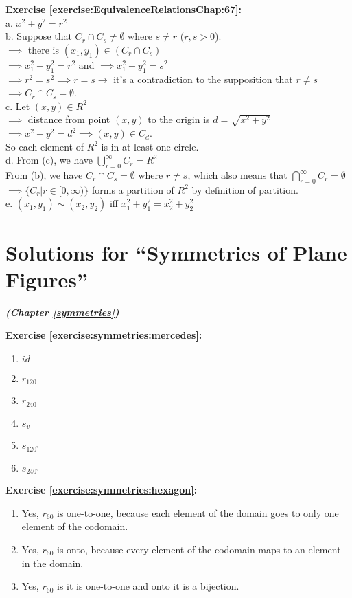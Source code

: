 \textbf{Exercise \ref{exercise:EquivalenceRelationsChap:67}:}\\
a. $x^2+y^2=r^2$\\
b. Suppose that $C_r\cap C_s \neq \emptyset$ where $s\neq r$ ($r,s>0$).\\
$\implies$  there is $(x_1,y_1)\in (C_r\cap C_s)$\\
$\implies x_1^2+y_1^2=r^2$ and $\implies x_1^2+y_1^2=s^2$\\
$\implies r^2=s^2 \implies r=s \to$ it's a contradiction to the supposition that $r\neq s$\\
$\implies C_r\cap C_s=\emptyset$.\\
c. Let $(x,y)\in R^2$\\
$\implies$  distance from point $(x,y)$ to the origin is $d=\sqrt{x^2+y^2}$\\
$\implies x^2+y^2=d^2 \implies (x,y)\in C_d$.\\
So each element of $R^2$ is in at least one circle.\\
d. From (c), we have $\bigcup_{r=0}^{\infty}C_r=R^2$\\
From (b), we have $C_r\cap C_s=\emptyset$ where $r\neq s$, which also means that $\bigcap_{r=0}^{\infty}C_r=\emptyset$\\
$\implies \{C_r|r\in [0,\infty)\}$ forms a partition of $R^2$ by definition of partition.\\
e. $(x_1,y_1)\sim (x_2,y_2)$ iff $x_1^2+y_1^2=x_2^2+y_2^2$\\


\section{Solutions for  ``Symmetries of Plane Figures''}
\noindent\textbf{\textit{ (Chapter \ref{symmetries})}}\bigskip

\noindent\textbf{Exercise \ref{exercise:symmetries:mercedes}:}
\begin{enumerate}
\item
$id$
\item
$r_{120}$
\item
$r_{240}$
\item
$s_v$
\item
$s_{120^{\circ}}$
\item
$s_{240^{\circ}}$
\end{enumerate}

\noindent\textbf{Exercise \ref{exercise:symmetries:hexagon}:}
\begin{enumerate}[{a.}]
\item
Yes, $r_{60}$ is one-to-one, because each element of the domain goes to only one element of the codomain.
\item
Yes, $r_{60}$ is onto, because every element of the codomain maps to an element in the domain.
\item
Yes, $r_{60}$ is it is one-to-one and onto it is a bijection.
\end{enumerate}

